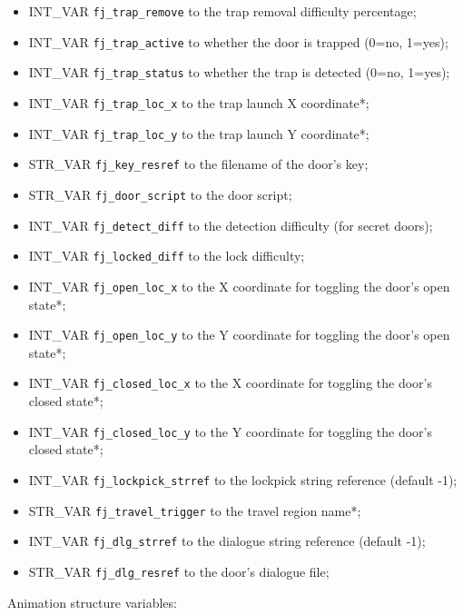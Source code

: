 \documentclass{article}
\begin{document}
\begin{itemize}
\item INT_VAR \verb+fj_trap_remove+ to the trap removal difficulty percentage;
\item INT_VAR \verb+fj_trap_active+ to whether the door is trapped (0=no, 1=yes);
\item INT_VAR \verb+fj_trap_status+ to whether the trap is detected (0=no, 1=yes);
\item INT_VAR \verb+fj_trap_loc_x+ to the trap launch X coordinate*;
\item INT_VAR \verb+fj_trap_loc_y+ to the trap launch Y coordinate*;
\item STR_VAR \verb+fj_key_resref+ to the filename of the door's key;
\item STR_VAR \verb+fj_door_script+ to the door script;
\item INT_VAR \verb+fj_detect_diff+ to the detection difficulty (for secret doors);
\item INT_VAR \verb+fj_locked_diff+ to the lock difficulty;
\item INT_VAR \verb+fj_open_loc_x+ to the X coordinate for toggling the door's open state*;
\item INT_VAR \verb+fj_open_loc_y+ to the Y coordinate for toggling the door's open state*;
\item INT_VAR \verb+fj_closed_loc_x+ to the X coordinate for toggling the door's closed state*;
\item INT_VAR \verb+fj_closed_loc_y+ to the Y coordinate for toggling the door's closed state*;
\item INT_VAR \verb+fj_lockpick_strref+ to the lockpick string reference (default -1);
\item STR_VAR \verb+fj_travel_trigger+ to the travel region name*;
\item INT_VAR \verb+fj_dlg_strref+ to the dialogue string reference (default -1);
\item STR_VAR \verb+fj_dlg_resref+ to the door's dialogue file;
\end{itemize}
Animation structure variables:
\end{document}

